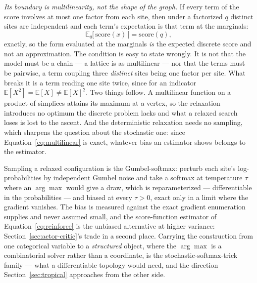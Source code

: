 \documentclass[11pt,a4paper]{article}
\begin{document}
\emph{Its boundary is multilinearity, not the shape of the graph.} If every
term of the score involves at most one factor from each site, then under a
factorized $q$ distinct sites are independent and each term's expectation is
that term at the marginals:
\begin{equation}
  \mathbb{E}_{q}\big[\,\mathrm{score}(x)\,\big] = \mathrm{score}(q),
  \label{eq:multilinear}
\end{equation}
exactly, so the form evaluated at the marginals \emph{is} the expected discrete
score and not an approximation. The condition is easy to state wrongly. It is
not that the model must be a chain --- a lattice is as multilinear --- nor that
the terms must be pairwise, a term coupling three \emph{distinct} sites being
one factor per site. What breaks it is a term reading one site twice, since for
an indicator $\mathbb{E}[X^2] = \mathbb{E}[X] \neq \mathbb{E}[X]^2$. Two things
follow. A multilinear function on a product of simplices attains its maximum at
a vertex, so the relaxation introduces no optimum the discrete problem lacks
and what a relaxed search loses is lost to the ascent. And the deterministic
relaxation needs no sampling, which sharpens the question about the stochastic
one: since Equation~\ref{eq:multilinear} is exact, whatever bias an estimator
shows belongs to the estimator.

Sampling a relaxed configuration is the Gumbel-softmax: perturb each site's
log-probabilities by independent Gumbel noise and take a softmax at
temperature $\tau$ where an $\arg\max$ would give a draw, which is
reparameterized --- differentiable in the probabilities --- and biased at every
$\tau > 0$, exact only in a limit where the gradient vanishes. The bias is
measured against the exact gradient enumeration supplies and never assumed
small, and the score-function estimator of Equation~\ref{eq:reinforce} is the
unbiased alternative at higher variance: Section~\ref{sec:actor-critic}'s trade
in a second place. Carrying the construction from one categorical variable to a
\emph{structured} object, where the $\arg\max$ is a combinatorial solver rather
than a coordinate, is the stochastic-softmax-trick family \citep{paulus2020}
--- what a differentiable topology would need, and the direction
Section~\ref{sec:tropical} approaches from the other side.
\end{document}
